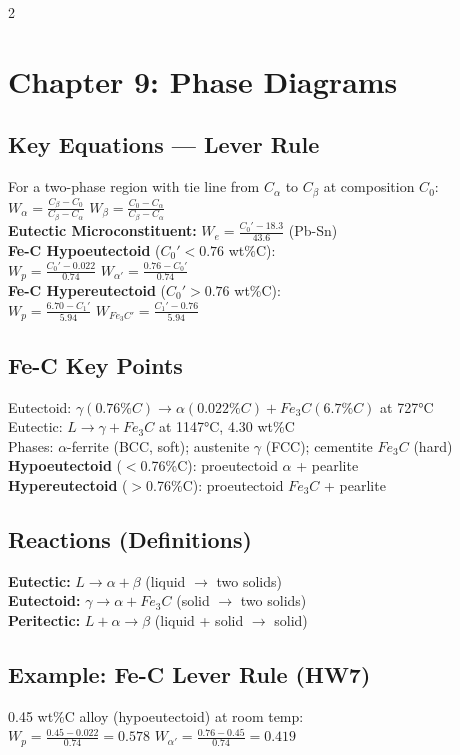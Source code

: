 \documentclass[8pt]{extarticle}
\begin{document}
\begin{multicols*}{2}
\section*{Chapter 9: Phase Diagrams}
\subsection*{Key Equations — Lever Rule}
For a two-phase region with tie line from $C_\alpha$ to $C_\beta$ at composition $C_0$: \\
$W_\alpha = \frac{C_\beta - C_0}{C_\beta - C_\alpha}$ \quad $W_\beta = \frac{C_0 - C_\alpha}{C_\beta - C_\alpha}$ \\
\textbf{Eutectic Microconstituent:} $W_e = \frac{C_0' - 18.3}{43.6}$ (Pb-Sn) \\
\textbf{Fe-C Hypoeutectoid} ($C_0' < 0.76$ wt\%C): \\
$W_p = \frac{C_0' - 0.022}{0.74}$ \quad $W_{\alpha'} = \frac{0.76 - C_0'}{0.74}$ \\
\textbf{Fe-C Hypereutectoid} ($C_0' > 0.76$ wt\%C): \\
$W_p = \frac{6.70 - C_1'}{5.94}$ \quad $W_{Fe_3C'} = \frac{C_1' - 0.76}{5.94}$
\subsection*{Fe-C Key Points}
Eutectoid: $\gamma(0.76\%C) \rightarrow \alpha(0.022\%C) + Fe_3C(6.7\%C)$ at 727°C \\
Eutectic: $L \rightarrow \gamma + Fe_3C$ at 1147°C, 4.30 wt\%C \\
Phases: $\alpha$-ferrite (BCC, soft); austenite $\gamma$ (FCC); cementite $Fe_3C$ (hard) \\
\textbf{Hypoeutectoid} ($<$0.76\%C): proeutectoid $\alpha$ + pearlite \\
\textbf{Hypereutectoid} ($>$0.76\%C): proeutectoid $Fe_3C$ + pearlite
\subsection*{Reactions (Definitions)}
\textbf{Eutectic:} $L \rightarrow \alpha + \beta$ (liquid $\to$ two solids) \\
\textbf{Eutectoid:} $\gamma \rightarrow \alpha + Fe_3C$ (solid $\to$ two solids) \\
\textbf{Peritectic:} $L + \alpha \rightarrow \beta$ (liquid + solid $\to$ solid)
\subsection*{Example: Fe-C Lever Rule (HW7)}
0.45 wt\%C alloy (hypoeutectoid) at room temp: \\
$W_p = \frac{0.45 - 0.022}{0.74} = 0.578$ \quad $W_{\alpha'} = \frac{0.76-0.45}{0.74} = 0.419$


\end{multicols*}
\end{document}
